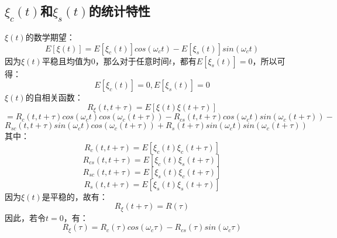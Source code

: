 \documentclass[12pt,a4paper,oneside]{ctexart}
\begin{document}
\begin{itemize}
\subsection{$\xi_{c}(t)$和$\xi_{s}(t)$的统计特性}
$\xi(t)$的数学期望：
$$
    E\left[\xi(t)\right] = E\left[\xi_{c}(t)\right]cos(\omega_{c}t) - E\left[\xi_{s}(t)\right]sin(\omega_{c}t)
$$
因为$\xi(t)$平稳且均值为0，那么对于任意时间$t$，都有$E\left[\xi_{s}(t)\right] = 0$，所以可得：
$$
    E\left[\xi_{c}(t)\right] = 0,E\left[\xi_{s}(t)\right] = 0
$$
$\xi(t)$的自相关函数：
$$
    R_{\xi}(t,t + \tau) = E\left[\xi(t)\xi(t + \tau)\right]
$$
$$
     = R_{c}(t,t + \tau)cos(\omega_{c}t)cos(\omega_{c}(t + \tau))  - R_{cs}(t,t + \tau)cos(\omega_{c}t)sin(\omega_{c}(t + \tau)) - 
$$
$$
    R_{sc}(t,t + \tau)sin(\omega_{c}t)cos(\omega_{c}(t + \tau)) + R_{s}(t + \tau)sin(\omega_{c}t)sin(\omega_{c}(t + \tau))
$$
其中：
$$
    R_{c}(t,t + \tau) = E\left[\xi_{c}(t)\xi_{c}(t + \tau)\right]
$$
$$
    R_{cs}(t, t + \tau) = E\left[\xi_{c}(t)\xi_{s}(t + \tau)\right]
$$
$$
    R_{sc}(t, t + \tau) = E\left[\xi_{s}(t)\xi_{c}(t + \tau)\right]
$$
$$
    R_{s}(t, t + \tau) = E\left[\xi_{s}(t)\xi_{s}(t + \tau)\right]
$$
因为$\xi(t)$是平稳的，故有：
$$
    R_{\xi}(t + \tau) = R(\tau)
$$
因此，若令$t = 0$，有：
$$
    R_{\xi}(\tau)  = R_{c}(\tau)cos(\omega_{c}\tau) - R_{cs}(\tau)sin(\omega_{c}\tau)
$$
\end{itemize}
\end{document}
